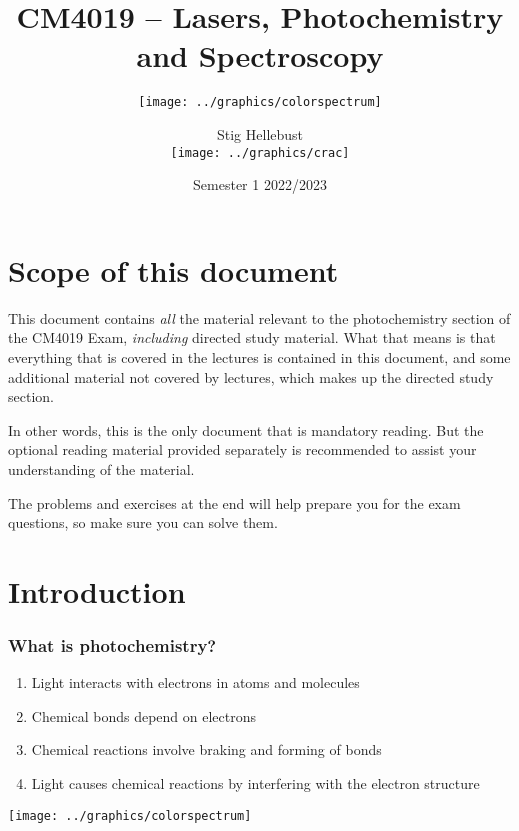 \documentclass[ignorenonframetext]{beamer}
\title{CM4019 -- Lasers, Photochemistry and Spectroscopy}
\subtitle{\texttt{[image: ../graphics/colorspectrum]}}
\author{Stig Hellebust \\\texttt{[image: ../graphics/crac]}}
\institute{School of Chemistry \\ University College Cork}
\date{Semester 1 2022/2023}
\begin{document}

\begin{frame}
	\titlepage
\end{frame}

\newpage

\section*{Scope of this document}
This document contains \emph{all} the material relevant to the photochemistry section of the CM4019 Exam, \emph{including} directed study material. What that means is that everything that is covered in the lectures is contained in this document, and some additional material not covered by lectures, which makes up the directed study section. 

In other words, this is the only document that is mandatory reading. But the optional reading material provided separately is recommended to assist your understanding of the material.

The problems and exercises at the end will help prepare you for the exam questions, so make sure you can solve them.

\section{Introduction}


\begin{frame}[<+->]
\frametitle{What is photochemistry?}
\begin{enumerate}
\item Light interacts with electrons in atoms and molecules
\item Chemical bonds depend on electrons
\item Chemical reactions involve braking and forming of bonds
\item Light causes chemical reactions by interfering with the electron structure
\end{enumerate}
\end{frame}

\begin{frame}
  \begin{center}
     \texttt{[image: ../graphics/colorspectrum]}
  \end{center}
\end{frame}
\end{document}
